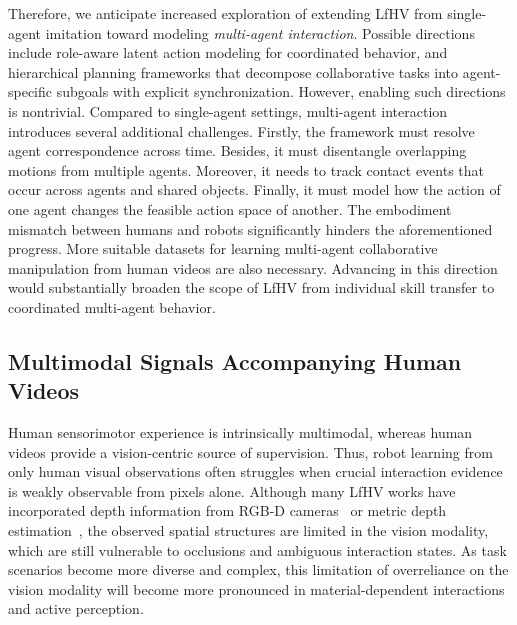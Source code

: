 \documentclass[Afour,sageh,times]{sagej}
\begin{document}
Therefore, we anticipate increased exploration of extending LfHV from single-agent imitation toward modeling \textit{multi-agent interaction}. Possible directions include role-aware latent action modeling for coordinated behavior, and hierarchical planning frameworks that decompose collaborative tasks into agent-specific subgoals with explicit synchronization. However, enabling such directions is nontrivial. Compared to single-agent settings, multi-agent interaction introduces several additional challenges. Firstly, the framework must resolve agent correspondence across time. Besides, it must disentangle overlapping motions from multiple agents. Moreover, it needs to track contact events that occur across agents and shared objects. Finally, it must model how the action of one agent changes the feasible action space of another. The embodiment mismatch between humans and robots significantly hinders the aforementioned progress. More suitable datasets for learning multi-agent collaborative manipulation from human videos are also necessary. Advancing in this direction would substantially broaden the scope of LfHV from individual skill transfer to coordinated multi-agent behavior.


\subsection{Multimodal Signals Accompanying Human Videos}

Human sensorimotor experience is intrinsically multimodal, whereas human videos provide a vision-centric source of supervision. Thus, robot learning from only human visual observations often struggles when crucial interaction evidence is weakly observable from pixels alone. Although many LfHV works have incorporated depth information from RGB-D cameras~\citep{zhu2024vision,bharadhwaj2024track2act,ma2025uni} or metric depth estimation~\citep{chen2025vidbot,li2025novaflow,govind2026unilact}, the observed spatial structures are limited in the vision modality, which are still vulnerable to occlusions and ambiguous interaction states. As task scenarios become more diverse and complex, this limitation of overreliance on the vision modality will become more pronounced in material-dependent interactions and active perception.
\end{document}
